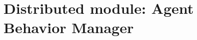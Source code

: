 \section{Distributed module: Agent Behavior Manager}
\label{sec:Distributed module: behavior manager}



